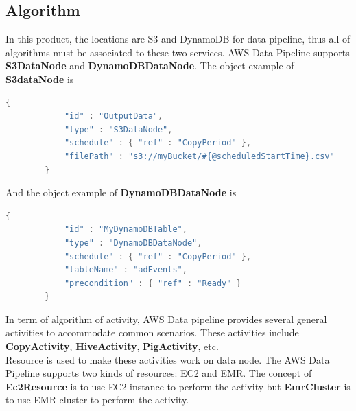 	\subsection{Algorithm}
	In this product, the locations are S3 and DynamoDB for data pipeline, thus all of algorithms must be associated to these two services. AWS Data Pipeline supports \textbf{S3DataNode} and \textbf{DynamoDBDataNode}. The  object example of \textbf{S3dataNode} is

	\begin{lstlisting}[language=Java, caption=S3 Data Node example\cite{z6}]
        {
            "id" : "OutputData",
            "type" : "S3DataNode",
            "schedule" : { "ref" : "CopyPeriod" },
            "filePath" : "s3://myBucket/#{@scheduledStartTime}.csv"
        }
	\end{lstlisting}
	And the object example of \textbf{DynamoDBDataNode} is 
	\begin{lstlisting}[language=Java, caption=DynamoDB Data Node example\cite{z7}]
        {
            "id" : "MyDynamoDBTable",
            "type" : "DynamoDBDataNode",
            "schedule" : { "ref" : "CopyPeriod" },
            "tableName" : "adEvents",
            "precondition" : { "ref" : "Ready" }
        }
	\end{lstlisting}

	\noindent In term of algorithm of activity, AWS Data pipeline provides several general activities to accommodate common scenarios. These activities include \textbf{CopyActivity}, \textbf{HiveActivity}, \textbf{PigActivity}, etc.\\ 
    
    \noindent Resource is used to make these activities work on data node. The AWS Data Pipeline supports two kinds of resources: EC2 and EMR. The concept of \textbf{Ec2Resource} is to use EC2 instance to perform the activity but \textbf{EmrCluster} is to use EMR cluster to perform the activity. 


